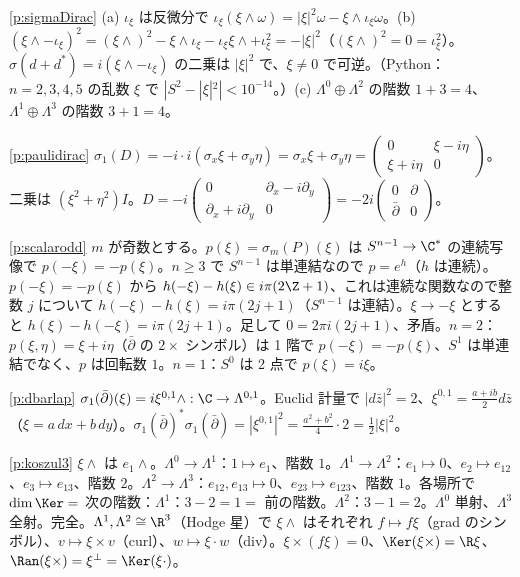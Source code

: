 \begin{sol}{\ref{p:sigmaDirac}}
(a) $\iota_\xi$ は反微分で $\iota_\xi(\xi\wedge\omega)=|\xi|^2\omega-\xi\wedge\iota_\xi\omega$。(b) $(\xi\wedge-\iota_\xi)^2=(\xi\wedge)^2-\xi\wedge\iota_\xi-\iota_\xi\xi\wedge+\iota_\xi^2=-|\xi|^2$（$(\xi\wedge)^2=0=\iota_\xi^2$）。$\sigma(d+d^*)=i(\xi\wedge-\iota_\xi)$ の二乗は $|\xi|^2$ で、$\xi\ne0$ で可逆。（Python：$n=2,3,4,5$ の乱数 $\xi$ で $|S^2-|\xi|^2|<10^{-14}$。）(c) $\Lambda^0\oplus\Lambda^2$ の階数 $1+3=4$、$\Lambda^1\oplus\Lambda^3$ の階数 $3+1=4$。
\end{sol}
\begin{sol}{\ref{p:paulidirac}}
$\sigma_1(D)=-i\cdot i(\sigma_x\xi+\sigma_y\eta)=\sigma_x\xi+\sigma_y\eta=\begin{pmatrix}0&\xi-i\eta\\\xi+i\eta&0\end{pmatrix}$。二乗は $(\xi^2+\eta^2)I$。$D=-i\begin{pmatrix}0&\partial_x-i\partial_y\\\partial_x+i\partial_y&0\end{pmatrix}=-2i\begin{pmatrix}0&\partial\\\bar\partial&0\end{pmatrix}$。
\end{sol}
\begin{sol}{\ref{p:scalarodd}}
$m$ が奇数とする。$p(\xi)=\sigma_m(P)(\xi)$ は $S^{n-1}\to\C^*$ の連続写像で $p(-\xi)=-p(\xi)$。$n\ge3$ で $S^{n-1}$ は単連結なので $p=e^h$（$h$ は連続）。$p(-\xi)=-p(\xi)$ から $h(-\xi)-h(\xi)\in i\pi(2\Z+1)$、これは連続な関数なので整数 $j$ について $h(-\xi)-h(\xi)=i\pi(2j+1)$（$S^{n-1}$ は連結）。$\xi\to-\xi$ とすると $h(\xi)-h(-\xi)=i\pi(2j+1)$。足して $0=2\pi i(2j+1)$、矛盾。$n=2$：$p(\xi,\eta)=\xi+i\eta$（$\bar\partial$ の $2\times$ シンボル）は 1 階で $p(-\xi)=-p(\xi)$、$S^1$ は単連結でなく、$p$ は回転数 $1$。$n=1$：$S^0$ は 2 点で $p(\xi)=i\xi$。
\end{sol}
\begin{sol}{\ref{p:dbarlap}}
$\sigma_1(\bar\partial)(\xi)=i\xi^{0,1}\wedge:\C\to\Lambda^{0,1}$。Euclid 計量で $|d\bar z|^2=2$、$\xi^{0,1}=\frac{a+ib}2d\bar z$（$\xi=a\,dx+b\,dy$）。$\sigma_1(\bar\partial)^*\sigma_1(\bar\partial)=|\xi^{0,1}|^2=\frac{a^2+b^2}4\cdot2=\frac12|\xi|^2$。
\end{sol}
\begin{sol}{\ref{p:koszul3}}
$\xi\wedge$ は $e_1\wedge$。$\Lambda^0\to\Lambda^1$：$1\mapsto e_1$、階数 $1$。$\Lambda^1\to\Lambda^2$：$e_1\mapsto0$、$e_2\mapsto e_{12}$、$e_3\mapsto e_{13}$、階数 $2$。$\Lambda^2\to\Lambda^3$：$e_{12},e_{13}\mapsto0$、$e_{23}\mapsto e_{123}$、階数 $1$。各場所で $\dim\Ker=$ 次の階数：$\Lambda^1$：$3-2=1=$ 前の階数。$\Lambda^2$：$3-1=2$。$\Lambda^0$ 単射、$\Lambda^3$ 全射。完全。$\Lambda^1,\Lambda^2\cong\R^3$（Hodge 星）で $\xi\wedge$ はそれぞれ $f\mapsto f\xi$（grad のシンボル）、$v\mapsto\xi\times v$（curl）、$w\mapsto\xi\cdot w$（div）。$\xi\times(f\xi)=0$、$\Ker(\xi\times)=\R\xi$、$\Ran(\xi\times)=\xi^\perp=\Ker(\xi\cdot)$。
\end{sol}
